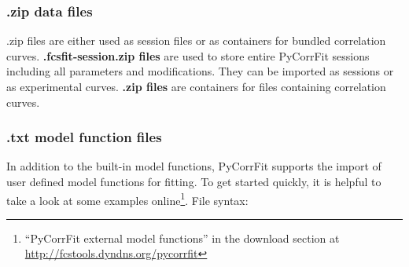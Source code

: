 \subsubsection{.zip data files} 
\mytilde .zip files are either used as session files or as containers for bundled correlation curves. 
\textbf{\mytilde .fcsfit-session.zip files} are used to store entire PyCorrFit sessions including all parameters and modifications. They can be imported as sessions or as experimental curves. 
\textbf{\mytilde .zip files} are containers for files containing correlation curves.

\subsubsection{.txt model function files} 
In addition to the built-in model functions, PyCorrFit supports the import of user defined model functions for fitting. To get started quickly, it is helpful to take a look at some examples online\footnote{``PyCorrFit external model functions'' in the download section at \url{http://fcstools.dyndns.org/pycorrfit}}.
File syntax:
